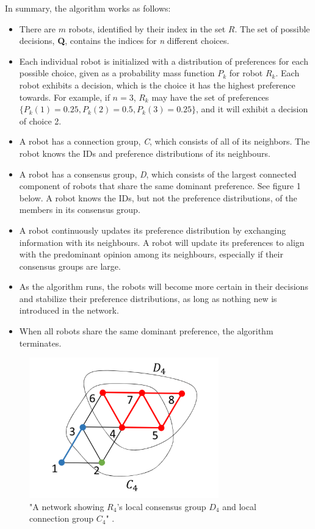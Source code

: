 In summary, the algorithm works as follows:
\begin{itemize}
    \item There are $m$ robots, identified by their index in the set $R$. The set of possible decisions, \textbf{Q}, contains the indices for \textit{n} different choices. 
    \item Each individual robot is initialized with a distribution of preferences for each possible choice, given as a probability mass function $P_k$ for robot $R_k$. Each robot exhibits a decision, which is the choice it has the highest preference towards. For example, if $n = 3$, $R_k$ may have the set of preferences $\{P_k(1) = 0.25, P_k(2) = 0.5, P_k(3) = 0.25\}$, and it will exhibit a decision of choice 2.
    \item A robot has a connection group, \textit{C}, which consists of all of its neighbors. The robot knows the IDs and preference distributions of its neighbours. 
    \item A robot has a consensus group, \textit{D}, which consists of the largest connected component of robots that share the same dominant preference. See figure 1 below. A robot knows the IDs, but not the preference distributions, of the members in its consensus group. 
    \item A robot continuously updates its preference distribution by exchanging information with its neighbours. A robot will update its preferences to align with the predominant opinion among its neighbours, especially if their consensus groups are large.
    \item As the algorithm runs, the robots will become more certain in their decisions and stabilize their preference distributions, as long as nothing new is introduced in the network.
    \item When all robots share the same dominant preference, the algorithm terminates.
\end{itemize}

\begin{figure}[H]
    \centering
    \includegraphics[width=0.5\linewidth]{pictures/Lee-Liu figure.png}
    \caption{"A network showing \(R_4\)'s local consensus group \(D_4\)
    and local connection group \(C_4\)" \parencite[Fig. 2]{AlgorithmPaper}.}
    \label{fig:ConsensusGroupsFromArticle}
\end{figure}

